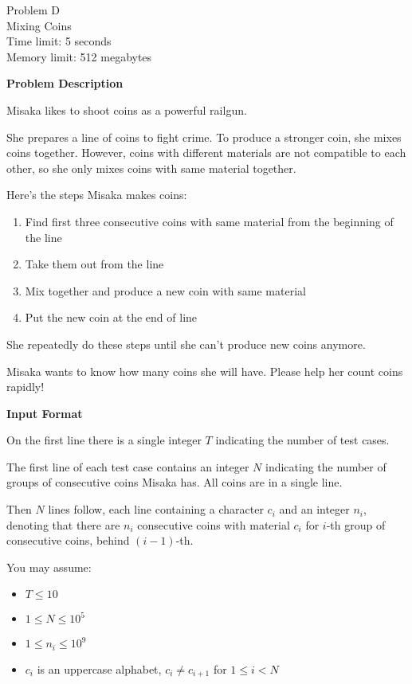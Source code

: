 \begin{center}
    {\LARGE Problem D}\vspace{1mm}\\
    {\Large Mixing Coins}\\
    {Time limit: 5 seconds}\\
    {Memory limit: 512 megabytes}
\end{center}

\textbf{\large Problem Description}

Misaka likes to shoot coins as a powerful railgun.

She prepares a line of coins to fight crime. To produce a stronger coin, she
mixes coins together. However, coins with different materials are not compatible
to each other, so she only mixes coins with same material together.

Here's the steps Misaka makes coins:

\begin{enumerate}
	\item Find first three consecutive coins with same material from the
	beginning of the line
	\item Take them out from the line
	\item Mix together and produce a new coin with same material
	\item Put the new coin at the end of line
\end{enumerate}

She repeatedly do these steps until she can't produce new coins anymore.

Misaka wants to know how many coins she will have. Please help her count coins
rapidly!

\textbf{\large Input Format}

On the first line there is a single integer $T$ indicating the number of test
cases.

The first line of each test case contains an integer $N$ indicating the number
of groups of consecutive coins Misaka has. All coins are in a single line.

Then $N$ lines follow, each line containing a character $c_i$ and an integer
$n_i$, denoting that there are $n_i$ consecutive coins with material $c_i$ for
$i$-th group of consecutive coins, behind $(i-1)$-th.

You may assume:
\begin{itemize}
    \tightlist{}
    \item $T \leq 10$
    \item $1 \leq N \leq 10^5$
    \item $1 \leq n_i \leq 10^9$
    \item $c_i$ is an uppercase alphabet, $c_i \neq c_{i+1}$ for $1 \leq i < N$
\end{itemize}

